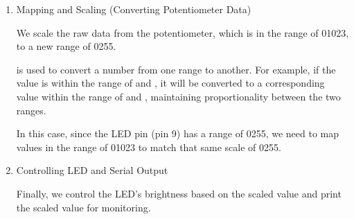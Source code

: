 \documentclass[a4paper,11pt,english]{sphinxmanual}
\begin{document}
\begin{enumerate}
\item {} 
\sphinxAtStartPar
Mapping and Scaling (Converting Potentiometer Data)

\sphinxAtStartPar
We scale the raw data from the potentiometer, which is in the range of 0\sphinxhyphen{}1023, to a new range of 0\sphinxhyphen{}255.

\sphinxAtStartPar
{} is used to convert a number from one range to another. For example, if the value is within the range of  and , it will be converted to a corresponding value within the range of  and , maintaining proportionality between the two ranges.

\sphinxAtStartPar
In this case, since the LED pin (pin 9) has a range of 0\sphinxhyphen{}255, we need to map values in the range of 0\sphinxhyphen{}1023 to match that same scale of 0\sphinxhyphen{}255.

\begin{sphinxVerbatim}[commandchars=\\\{\}]
\end{sphinxVerbatim}

\item {} 
\sphinxAtStartPar
Controlling LED and Serial Output

\sphinxAtStartPar
Finally, we control the LED’s brightness based on the scaled value and print the scaled value for monitoring.

\begin{sphinxVerbatim}[commandchars=\\\{\}]
\end{sphinxVerbatim}

\end{enumerate}
\end{document}
